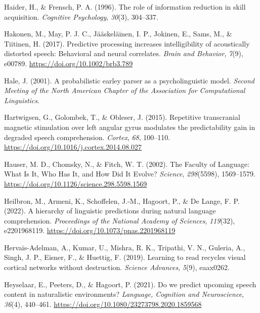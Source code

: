 \documentclass[a4paper, nobind]{templates/ociamthesis}
\newlength{\cslhangindent}
\newenvironment{CSLReferences}[2] %
 {%
  \setlength{\parindent}{0pt}
  \ifodd #1
  \let\oldpar\par
  \def\par{\hangindent=\cslhangindent\oldpar}
  \fi
  \setlength{\parskip}{1mm}
  \setlength{\baselineskip}{6mm}
 }%
 {}
\begin{document}
\begin{CSLReferences}{1}{0}
\leavevmode{}%
Haider, H., \& Frensch, P. A. (1996). The role of information reduction in skill acquisition. \emph{Cognitive Psychology}, \emph{30}(3), 304--337.

\leavevmode{}%
Hakonen, M., May, P. J. C., Jääskeläinen, I. P., Jokinen, E., Sams, M., \& Tiitinen, H. (2017). Predictive processing increases intelligibility of acoustically distorted speech: Behavioral and neural correlates. \emph{Brain and Behavior}, \emph{7}(9), e00789. \url{https://doi.org/10.1002/brb3.789}

\leavevmode{}%
Hale, J. (2001). A probabilistic earley parser as a psycholinguistic model. \emph{Second Meeting of the North American Chapter of the Association for Computational Linguistics}.

\leavevmode{}%
Hartwigsen, G., Golombek, T., \& Obleser, J. (2015). Repetitive transcranial magnetic stimulation over left angular gyrus modulates the predictability gain in degraded speech comprehension. \emph{Cortex}, \emph{68}, 100--110. \url{https://doi.org/10.1016/j.cortex.2014.08.027}

\leavevmode{}%
Hauser, M. D., Chomsky, N., \& Fitch, W. T. (2002). The Faculty of Language: What Is It, Who Has It, and How Did It Evolve? \emph{Science}, \emph{298}(5598), 1569--1579. \url{https://doi.org/10.1126/science.298.5598.1569}

\leavevmode{}%
Heilbron, M., Armeni, K., Schoffelen, J.-M., Hagoort, P., \& De Lange, F. P. (2022). A hierarchy of linguistic predictions during natural language comprehension. \emph{Proceedings of the National Academy of Sciences}, \emph{119}(32), e2201968119. \url{https://doi.org/10.1073/pnas.2201968119}

\leavevmode{}%
Hervais-Adelman, A., Kumar, U., Mishra, R. K., Tripathi, V. N., Guleria, A., Singh, J. P., Eisner, F., \& Huettig, F. (2019). Learning to read recycles visual cortical networks without destruction. \emph{Science Advances}, \emph{5}(9), eaax0262.

\leavevmode{}%
Heyselaar, E., Peeters, D., \& Hagoort, P. (2021). {Do we predict upcoming speech content in naturalistic environments?} \emph{Language, Cognition and Neuroscience}, \emph{36}(4), 440--461. \url{https://doi.org/10.1080/23273798.2020.1859568}


\end{CSLReferences}
\end{document}
